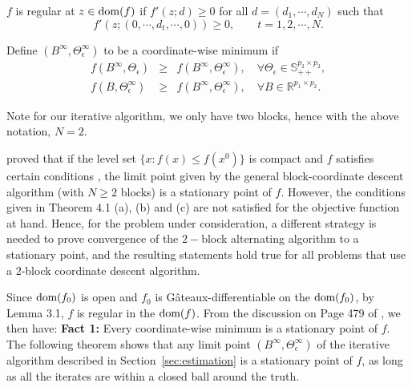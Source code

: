 \begin{definition} $f$ is regular at $z\in\mbox{dom}(f)$ if $f'(z;d)\geq 0$ for all $d=(d_1,\cdots,d_N)$ such that 
\begin{equation*}
f'(z;(0,\cdots,d_t,\cdots,0))\geq 0,\qquad t=1,2,\cdots,N.
\end{equation*}  
\end{definition}

\begin{definition} Define $(B^\infty,\Theta_\epsilon^\infty)$ to be a coordinate-wise minimum if 
\begin{eqnarray*}
f(B^{\infty},\Theta_\epsilon) &\geq& f(B^\infty,\Theta_\epsilon^\infty), \quad \forall \Theta_\epsilon\in \mathbb{S}_{++}^{p_2\times p_2}, \\
f(B,\Theta_\epsilon^{\infty})&\geq & f(B^{\infty},\Theta_\epsilon^{\infty}),\quad \forall B\in\mathbb{R}^{p_1\times p_2}.
\end{eqnarray*}
\end{definition}
Note for our iterative algorithm, we only have two blocks, hence with the above notation, $N=2$. 

\begin{remark}
\citet{tseng2001convergence} proved that if the level set $\{x:f(x)\leq f(x^0)\}$ is compact and $f$ satisfies certain conditions \citep[see Theorem 4.1 (a), (b) and (c) for details]{tseng2001convergence}, the limit point given by the general block-coordinate descent algorithm (with $N\geq 2$ blocks) is a stationary point of $f$. However, the conditions given in Theorem 4.1 (a), (b) and (c) are not satisfied for the objective function at hand. Hence, for the problem under consideration, a different strategy is needed to prove convergence of the $2-$block alternating algorithm to a stationary point, and the resulting statements hold true for all problems that use a $2$-block coordinate descent algorithm.
\end{remark}
\medskip
Since $\mbox{dom}(f_0)$ is open and $f_0$ is G\^{a}teaux-differentiable on the $\mbox{dom}(f_0)$, by \citet{tseng2001convergence} Lemma 3.1, $f$ is regular in the $\mbox{dom} (f)$. From the discussion on Page 479 of \citep{tseng2001convergence}, we then have: 
\newline
\newline
{\bf Fact 1:} 
Every coordinate-wise minimum is a stationary point of $f$.
\newline
\newline
The following theorem shows that any limit point $(B^\infty,\Theta_\epsilon^\infty)$ of the iterative algorithm described in Section~\ref{sec:estimation} is a stationary point of $f$, as long as all the iterates are within a closed ball around the truth.

